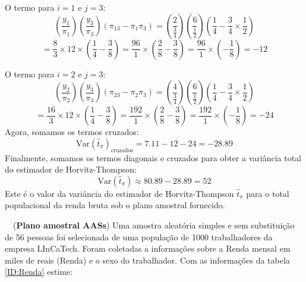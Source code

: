 \documentclass[a4paper,12pt,oneside,twocolumn]{Config/milktest}
\begin{document}
{O termo para \(i = 1\) e \(j = 3\): 
\[
\left(\frac{y_1}{\pi_1}\right) \left(\frac{y_3}{\pi_3}\right) (\pi_{13} - \pi_1 \pi_3) = \left(\frac{2}{\frac{3}{4}}\right) \left(\frac{6}{\frac{1}{2}}\right) \left(\frac{1}{4} - \frac{3}{4} \times \frac{1}{2}\right)
\] 
\[
= \frac{8}{3} \times 12 \times \left(\frac{1}{4} - \frac{3}{8}\right) = \frac{96}{1} \times \left(\frac{2}{8} - \frac{3}{8}\right) = \frac{96}{1} \times \left(-\frac{1}{8}\right) = -12
\]

O termo para \(i = 2\) e \(j = 3\): 
\[
\left(\frac{y_2}{\pi_2}\right) \left(\frac{y_3}{\pi_3}\right) (\pi_{23} - \pi_2 \pi_3) = \left(\frac{4}{\frac{3}{4}}\right) \left(\frac{6}{\frac{1}{2}}\right) \left(\frac{1}{4} - \frac{3}{4} \times \frac{1}{2}\right)
\] 
\[
= \frac{16}{3} \times 12 \times \left(\frac{1}{4} - \frac{3}{8}\right) = \frac{192}{1} \times \left(\frac{2}{8} - \frac{3}{8}\right) = \frac{192}{1} \times \left(-\frac{1}{8}\right) = -24
\] 
Agora, somamos os termos cruzados: 
\[
\text{Var}(\hat{t}_\pi)_{\text{cruzados}} = 7.11 - 12 - 24 = -28.89
\] 
Finalmente, somamos os termos diagonais e cruzados para obter a variância total do estimador de Horvitz-Thompson:
\[
\text{Var}(\hat{t}_\pi) \approx 80.89 - 28.89 = 52
\] 
Este é o valor da variância do estimador de Horvitz-Thompson \(\hat{t}_\pi\) para o total populacional da renda bruta sob o plano amostral fornecido.

}



\medskip 
\question~~({\bf Plano amostral AASs}) Uma amostra aleatória simples e sem substituição de 56 pessoas foi selecionada de uma população de 1000 trabalhadores da empresa LInCaTech. Foram coletadas a informações sobre a Renda mensal em miles de reais (Renda) e o sexo do trabalhador. Com as informações da tabela \ref{ID:Renda} estime:
\end{document}
